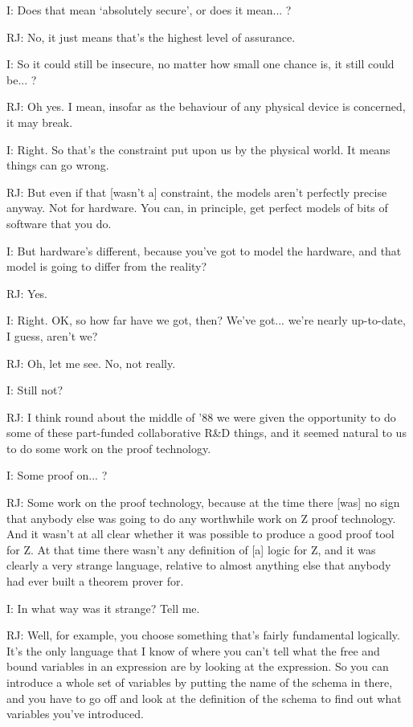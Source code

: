 \documentclass[10pt,titlepage]{book}
\begin{document}
I: Does that mean `absolutely secure', or does it mean... ?

RJ: No, it just means that's the highest level of assurance.

I: So it could still be insecure, no matter how small one chance is, it still could be... ?

RJ: Oh yes.
I mean, insofar as the behaviour of any physical device is concerned, it may break.

I: Right.
So that's the constraint put upon us by the physical world.
It means things can go wrong.

RJ: But even if that [wasn't a] constraint, the models aren't perfectly precise anyway.
Not for hardware.
You can, in principle, get perfect models of bits of software that you do.

I: But hardware's different, because you've got to model the hardware, and that model is going to differ from the reality?

RJ: Yes.

I: Right.
OK, so how far have we got, then?
We've got... we're nearly up-to-date, I guess, aren't we?

RJ: Oh, let me see.
No, not really.

I: Still not?

RJ: I think round about the middle of '88 we were given the opportunity to do some of these part-funded collaborative R\&D things, and it seemed natural to us to do some work on the proof technology.

I: Some proof on... ?

RJ: Some work on the proof technology, because at the time there [was] no sign that anybody else was going to do any worthwhile work on Z proof technology.
And it wasn't at all clear whether it was possible to produce a good proof tool for Z.
At that time there wasn't any definition of [a] logic for Z, and it was clearly a very strange language, relative to almost anything else that anybody had ever built a theorem prover for.

I: In what way was it strange?
Tell me.

RJ: Well, for example, you choose something that's fairly fundamental logically.
It's the only language that I know of where you can't tell what the free and bound variables in an expression are by looking at the expression.
So you can introduce a whole set of variables by putting the name of the schema in there, and you have to go off and look at the definition of the schema to find out what variables you've introduced.
\end{document}
